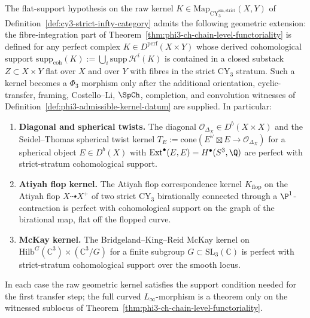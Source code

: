 \begin{proposition}
\label{prop:perfect-fm-kernel-phi3-ch}
The flat-support hypothesis on the raw kernel
$K \in \mathrm{Map}_{\mathrm{CY}_3^{\mathrm{sm,strict}}}(X, Y)$ of
Definition~\ref{def:cy3-strict-infty-category} admits the following
geometric extension: the fibre-integration part of
Theorem~\ref{thm:phi3-ch-chain-level-functoriality} is defined for any
perfect complex $K \in D^{\mathrm{perf}}(X \times Y)$ whose derived
cohomological support
$\mathrm{supp}_{\mathrm{coh}}(K) := \bigcup_i \mathrm{supp}\,\mathcal{H}^i(K)$
is contained in a closed substack $Z \subset X \times Y$ flat over $X$
and over $Y$ with fibres in the strict CY$_3$ stratum. Such a kernel
becomes a $\Phi_3$ morphism only after the additional orientation,
cyclic-transfer, framing, Costello--Li, $\SpCh$, completion, and
convolution witnesses of Definition~\ref{def:phi3-admissible-kernel-datum}
are supplied. In particular:
\begin{enumerate}[label=\textup{(\arabic*)}]
 \item \textbf{Diagonal and spherical twists.} The diagonal $\mathcal{O}_{\Delta_X} \in D^b(X \times X)$ and the Seidel--Thomas spherical twist kernel $T_E := \mathrm{cone}(E^\vee \boxtimes E \to \mathcal{O}_{\Delta_X})$ for a spherical object $E \in D^b(X)$ with $\mathrm{Ext}^\bullet(E, E) = H^\bullet(S^3, \Q)$ are perfect with strict-stratum cohomological support.
 \item \textbf{Atiyah flop kernel.} The Atiyah flop correspondence kernel $K_{\mathrm{flop}}$ on the Atiyah flop $X \dashrightarrow X^+$ of two strict CY$_3$ birationally connected through a $\P^1$-contraction is perfect with cohomological support on the graph of the birational map, flat off the flopped curve.
 \item \textbf{McKay kernel.} The Bridgeland--King--Reid McKay kernel on $\mathrm{Hilb}^G(\mathbb{C}^3) \times (\mathbb{C}^3 / G)$ for a finite subgroup $G \subset \mathrm{SL}_3(\mathbb{C})$ is perfect with strict-stratum cohomological support over the smooth locus.
\end{enumerate}
In each case the raw geometric kernel satisfies the support condition
needed for the first transfer step; the full curved $L_\infty$-morphism
is a theorem only on the witnessed sublocus of
Theorem~\ref{thm:phi3-ch-chain-level-functoriality}.
\end{proposition}

